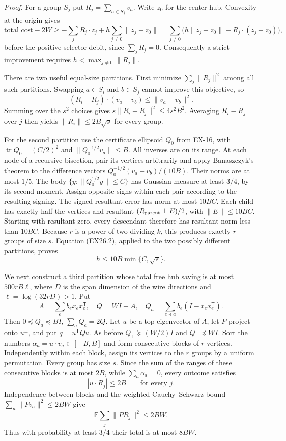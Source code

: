 \emph{Proof.}
For a group $S_j$ put $R_j=\sum_{a\in S_j}v_a$.
Write $z_0$ for the center hub. Convexity at the origin gives
\[
 \text{total cost}-2W
 \ge -\sum_jR_j\cdot z_j
          +h\sum_{j\ne0}\|z_j-z_0\|
 =\sum_{j\ne0}\bigl(h\|z_j-z_0\|
                    -R_j\cdot(z_j-z_0)\bigr),
 \tag{EX26.2}
\]
before the positive selector debit, since $\sum_jR_j=0$.
Consequently a strict improvement requires
$h<\max_{j\ne0}\|R_j\|$.

There are two useful equal-size partitions. First minimize
$\sum_j\|R_j\|^2$ among all such partitions. Swapping
$a\in S_i$ and $b\in S_j$ cannot improve this objective, so
\[
 (R_i-R_j)\cdot(v_a-v_b)\le\|v_a-v_b\|^2.
\]
Summing over the $s^2$ choices gives
$s\|R_i-R_j\|^2\le4s^2B^2$.
Averaging $R_i-R_j$ over $j$ then yields
$\|R_i\|\le2B\sqrt s$ for every group.

For the second partition use the certificate ellipsoid $Q_0$
from EX-16, with $\operatorname{tr}Q_0=(C/2)^2$ and
$\|Q_0^{-1/2}v_a\|\le B$. All inverses are on its range.
At each node of a recursive bisection, pair its vertices
arbitrarily and apply Banaszczyk's theorem to the difference
vectors
$Q_0^{-1/2}(v_a-v_b)/(10B)$.
Their norms are at most $1/5$. The body
$\{y:\|Q_0^{1/2}y\|\le C\}$ has Gaussian measure at least
$3/4$, by its second moment. Assign opposite signs within each
pair according to the resulting signing. The signed resultant
error has norm at most $10BC$. Each child has exactly half the
vertices and resultant $(R_{\rm parent}\pm E)/2$, with
$\|E\|\le10BC$. Starting with resultant zero, every descendant
therefore has resultant norm less than $10BC$. Because $r$ is
a power of two dividing $k$, this produces exactly $r$ groups
of size $s$. Equation (EX26.2), applied to the two possibly
different partitions, proves
\[
 h\le10B\min\{C,\sqrt s\}.
 \tag{EX26.3}
\]

We next construct a third partition whose total free hub saving
is at most $500rB\ell$, where $D$ is the span dimension of the
wire directions and $\ell=\log(32rD)>1$. Put
\[
 A=\sum_e b_ex_ex_e^{\mathsf T},\quad Q=WI-A,
 \quad Q_a=\sum_{e\ni a}b_e(I-x_ex_e^{\mathsf T}).
\]
Then $0\preceq Q_a\preceq BI$, $\sum_aQ_a=2Q$.
Let $u$ be a top eigenvector of $A$, let $P$ project onto
$u^\perp$, and put $q=u^{\mathsf T}Qu$.
As before $Q_\perp\succeq(W/2)I$ and $Q_\perp\preceq WI$.
Sort the numbers $\alpha_a=u\cdot v_a\in[-B,B]$ and form
consecutive blocks of $r$ vertices. Independently within each
block, assign its vertices to the $r$ groups by a uniform
permutation. Every group has size $s$. Since the sum of the
ranges of these consecutive blocks is at most $2B$, while
$\sum_a\alpha_a=0$, every outcome satisfies
\[
 |u\cdot R_j|\le2B\qquad\text{for every }j.
 \tag{EX26.4}
\]
Independence between blocks and the weighted Cauchy--Schwarz
bound $\sum_a\|Pv_a\|^2\le2BW$ give
\[
 \mathbb E\sum_j\|PR_j\|^2\le2BW.
\]
Thus with probability at least $3/4$ their total is at most $8BW$.

